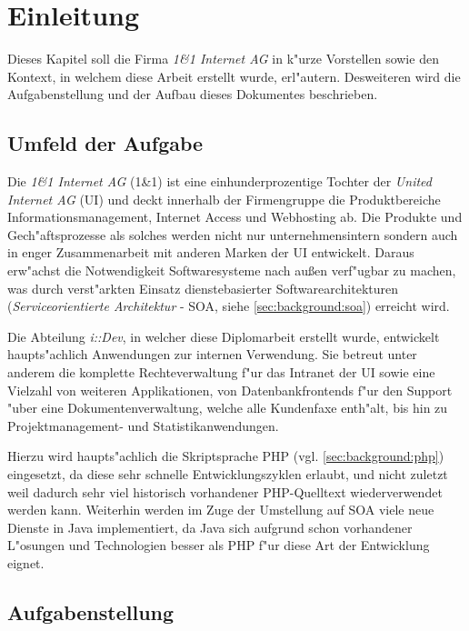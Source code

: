 \chapter{Einleitung}
\label{sec:intro}

Dieses Kapitel soll die Firma \emph{1\&1 Internet AG} in k"urze Vorstellen sowie
den Kontext, in welchem diese Arbeit erstellt wurde, erl"autern. Desweiteren wird 
die Aufgabenstellung und der Aufbau dieses Dokumentes beschrieben.

\section{Umfeld der Aufgabe}
\label{sec:intro:kontext}

Die \emph{1\&1 Internet AG} (1\&1) ist eine einhunderprozentige Tochter der 
\emph{United Internet AG} (UI) und deckt innerhalb der Firmengruppe die Produktbereiche Informationsmanagement,
Internet Access und Webhosting ab. Die Produkte und Gech"aftsprozesse als solches werden
nicht nur unternehmensintern sondern auch in enger Zusammenarbeit mit anderen Marken
der UI entwickelt. Daraus erw"achst die Notwendigkeit Softwaresysteme nach au\ss en
verf"ugbar zu machen, was durch verst"arkten Einsatz dienstebasierter 
Softwarearchitekturen (\emph{Serviceorientierte Architektur} - SOA, siehe \ref{sec:background:soa}) erreicht wird.

Die Abteilung \emph{i::Dev}, in welcher diese Diplomarbeit erstellt wurde, entwickelt
haupts"achlich Anwendungen zur internen Verwendung. Sie betreut unter anderem 
die komplette Rechteverwaltung f"ur das Intranet der UI sowie eine Vielzahl von
weiteren Applikationen, von Datenbankfrontends f"ur den Support "uber eine Dokumentenverwaltung,
welche alle Kundenfaxe enth"alt, bis hin zu Projektmanagement- und Statistikanwendungen.

Hierzu wird haupts"achlich die Skriptsprache PHP (vgl. \ref{sec:background:php}) eingesetzt, da diese sehr schnelle 
Entwicklungszyklen erlaubt, und nicht zuletzt weil dadurch sehr viel historisch vorhandener
PHP-Quelltext wiederverwendet werden kann. Weiterhin werden im Zuge der Umstellung auf SOA viele neue 
Dienste in Java implementiert, da Java sich aufgrund schon vorhandener L"osungen und Technologien besser 
als PHP f"ur diese Art der Entwicklung eignet. 

\section{Aufgabenstellung}
\label{sec:intro:assignment}

